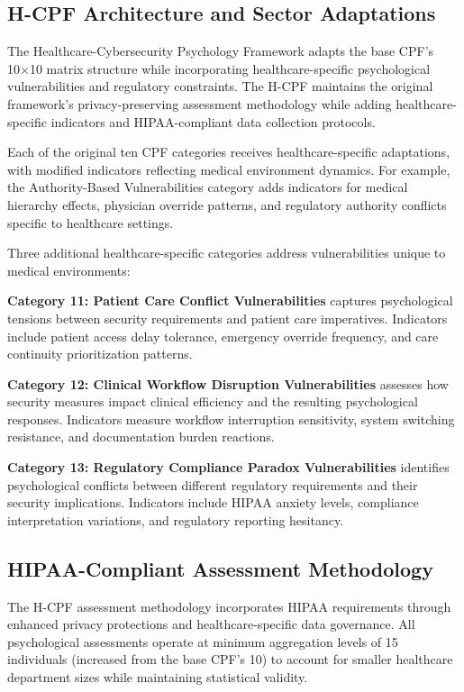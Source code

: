 \documentclass[10pt, twocolumn]{article}
\begin{document}
\subsection{H-CPF Architecture and Sector Adaptations}

The Healthcare-Cybersecurity Psychology Framework adapts the base CPF's 10×10 matrix structure while incorporating healthcare-specific psychological vulnerabilities and regulatory constraints. The H-CPF maintains the original framework's privacy-preserving assessment methodology while adding healthcare-specific indicators and HIPAA-compliant data collection protocols.

Each of the original ten CPF categories receives healthcare-specific adaptations, with modified indicators reflecting medical environment dynamics. For example, the Authority-Based Vulnerabilities category adds indicators for medical hierarchy effects, physician override patterns, and regulatory authority conflicts specific to healthcare settings.

Three additional healthcare-specific categories address vulnerabilities unique to medical environments:

\textbf{Category 11: Patient Care Conflict Vulnerabilities} captures psychological tensions between security requirements and patient care imperatives. Indicators include patient access delay tolerance, emergency override frequency, and care continuity prioritization patterns.

\textbf{Category 12: Clinical Workflow Disruption Vulnerabilities} assesses how security measures impact clinical efficiency and the resulting psychological responses. Indicators measure workflow interruption sensitivity, system switching resistance, and documentation burden reactions.

\textbf{Category 13: Regulatory Compliance Paradox Vulnerabilities} identifies psychological conflicts between different regulatory requirements and their security implications. Indicators include HIPAA anxiety levels, compliance interpretation variations, and regulatory reporting hesitancy.

\subsection{HIPAA-Compliant Assessment Methodology}

The H-CPF assessment methodology incorporates HIPAA requirements through enhanced privacy protections and healthcare-specific data governance. All psychological assessments operate at minimum aggregation levels of 15 individuals (increased from the base CPF's 10) to account for smaller healthcare department sizes while maintaining statistical validity.
\end{document}
